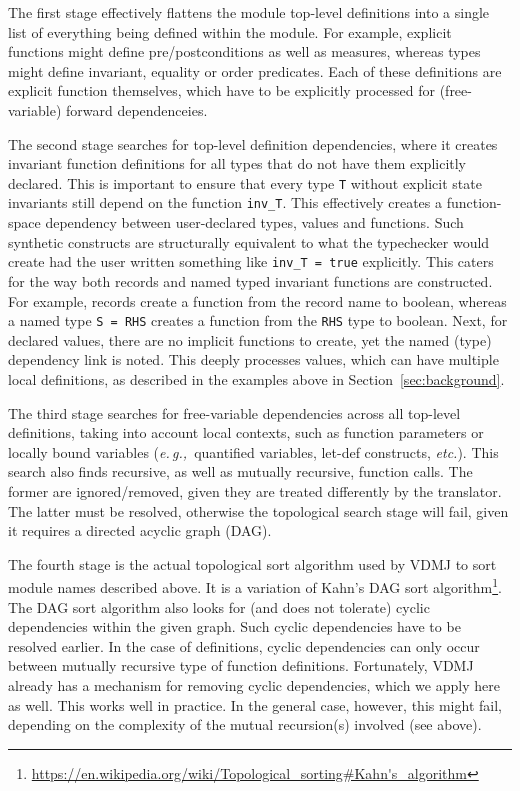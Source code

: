 \documentclass[runningheads,a4paper]{llncs}
\newcommand{\eg}{{\em e.\,g.,\/}}
\newcommand{\etc}{{\em etc.\/}}
\begin{document}
%
The first stage effectively flattens the module top-level definitions into a single list of everything being defined within the module. For example, explicit functions might define pre/postconditions as well as measures, whereas types might define invariant, equality or order predicates. Each of these definitions are explicit function themselves, which have to be explicitly processed for (free-variable) forward dependenceies. 

The second stage searches for top-level definition dependencies, where it creates invariant function definitions for all types that do not have them explicitly declared. This is important to ensure that every type \verb'T' without explicit state invariants still depend on the function \verb'inv_T'. This effectively creates a function-space dependency between user-declared types, values and functions. Such synthetic constructs are structurally equivalent to what the typechecker would create had the user written something like \verb'inv_T = true' explicitly. This caters for the way both records and named typed invariant functions are constructed. For example, records create a function from the record name to boolean, whereas a named type \verb'S = RHS' creates a function from the \verb'RHS' type to boolean. Next, for declared values, there are no implicit functions to create, yet the named (type) dependency link is noted. This deeply processes values, which can have multiple local definitions, as described in the examples above in Section~\ref{sec:background}.    

The third stage searches for free-variable dependencies across all top-level definitions, taking into account local contexts, such as function parameters or locally bound variables (\eg~quantified variables, let-def constructs, \etc). This search also finds recursive, as well as mutually recursive, function calls. The former are ignored/removed, given they are treated differently by the translator. The latter must be resolved, otherwise the topological search stage will fail, given it requires a directed acyclic graph (DAG).    

The fourth stage is the actual topological sort algorithm used by VDMJ to sort module names described above. It is a variation of Kahn's DAG sort algorithm\footnote{\url{https://en.wikipedia.org/wiki/Topological_sorting\#Kahn's_algorithm}}. The DAG sort algorithm also looks for (and does not tolerate) cyclic dependencies within the given graph. Such cyclic dependencies have to be resolved earlier. In the case of definitions, cyclic dependencies can only occur between mutually recursive type of function definitions. Fortunately, VDMJ already has a mechanism for removing cyclic dependencies, which we apply here as well. This works well in practice. In the general case, however, this might fail, depending on the complexity of the mutual recursion(s) involved (see above).
\end{document}
